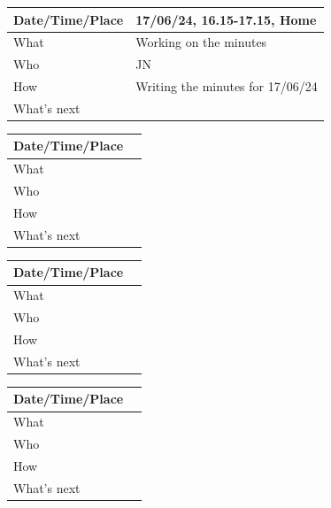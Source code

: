 \documentclass{article}
\begin{document}
\begin{table}[H]
\begin{tabular}{|p{1.5in}|p{4in}|}
\hline
Date/Time/Place & 17/06/24, 16.15-17.15, Home \\ \hline
What            & Working on the minutes \\ \hline
Who             &  JN\\ \hline
How             & Writing the minutes for 17/06/24 \\ \hline
What's next     &  \\ \hline
\end{tabular}
\end{table}

\begin{table}[H]
\begin{tabular}{|p{1.5in}|p{4in}|}
\hline
Date/Time/Place &  \\ \hline
What            &  \\ \hline
Who             &  \\ \hline
How             &  \\ \hline
What's next     &  \\ \hline
\end{tabular}
\end{table}

\begin{table}[H]
\begin{tabular}{|p{1.5in}|p{4in}|}
\hline
Date/Time/Place &  \\ \hline
What            &  \\ \hline
Who             &  \\ \hline
How             &  \\ \hline
What's next     &  \\ \hline
\end{tabular}
\end{table}

\begin{table}[H]
\begin{tabular}{|p{1.5in}|p{4in}|}
\hline
Date/Time/Place &  \\ \hline
What            &  \\ \hline
Who             &  \\ \hline
How             &  \\ \hline
What's next     &  \\ \hline
\end{tabular}
\end{table}
\end{document}
